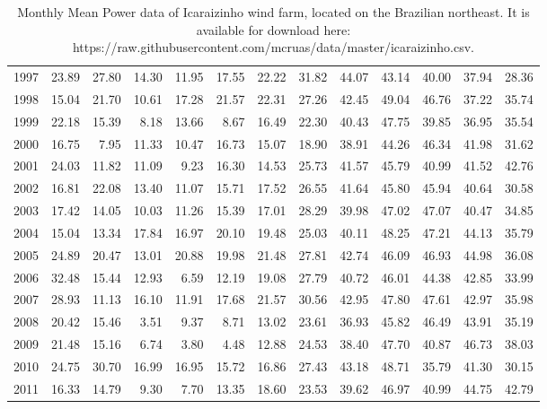 \begin{table}[ht]
\begin{tabular}{rrrrrrrrrrrrr}
  1997 & 23.89 & 27.80 & 14.30 & 11.95 & 17.55 & 22.22 & 31.82 & 44.07 & 43.14 & 40.00 & 37.94 & 28.36 \\ 
  1998 & 15.04 & 21.70 & 10.61 & 17.28 & 21.57 & 22.31 & 27.26 & 42.45 & 49.04 & 46.76 & 37.22 & 35.74 \\ 
  1999 & 22.18 & 15.39 & 8.18 & 13.66 & 8.67 & 16.49 & 22.30 & 40.43 & 47.75 & 39.85 & 36.95 & 35.54 \\ 
  2000 & 16.75 & 7.95 & 11.33 & 10.47 & 16.73 & 15.07 & 18.90 & 38.91 & 44.26 & 46.34 & 41.98 & 31.62 \\ 
  2001 & 24.03 & 11.82 & 11.09 & 9.23 & 16.30 & 14.53 & 25.73 & 41.57 & 45.79 & 40.99 & 41.52 & 42.76 \\ 
  2002 & 16.81 & 22.08 & 13.40 & 11.07 & 15.71 & 17.52 & 26.55 & 41.64 & 45.80 & 45.94 & 40.64 & 30.58 \\ 
  2003 & 17.42 & 14.05 & 10.03 & 11.26 & 15.39 & 17.01 & 28.29 & 39.98 & 47.02 & 47.07 & 40.47 & 34.85 \\ 
  2004 & 15.04 & 13.34 & 17.84 & 16.97 & 20.10 & 19.48 & 25.03 & 40.11 & 48.25 & 47.21 & 44.13 & 35.79 \\ 
  2005 & 24.89 & 20.47 & 13.01 & 20.88 & 19.98 & 21.48 & 27.81 & 42.74 & 46.09 & 46.93 & 44.98 & 36.08 \\ 
  2006 & 32.48 & 15.44 & 12.93 & 6.59 & 12.19 & 19.08 & 27.79 & 40.72 & 46.01 & 44.38 & 42.85 & 33.99 \\ 
  2007 & 28.93 & 11.13 & 16.10 & 11.91 & 17.68 & 21.57 & 30.56 & 42.95 & 47.80 & 47.61 & 42.97 & 35.98 \\ 
  2008 & 20.42 & 15.46 & 3.51 & 9.37 & 8.71 & 13.02 & 23.61 & 36.93 & 45.82 & 46.49 & 43.91 & 35.19 \\ 
  2009 & 21.48 & 15.16 & 6.74 & 3.80 & 4.48 & 12.88 & 24.53 & 38.40 & 47.70 & 40.87 & 46.73 & 38.03 \\ 
  2010 & 24.75 & 30.70 & 16.99 & 16.95 & 15.72 & 16.86 & 27.43 & 43.18 & 48.71 & 35.79 & 41.30 & 30.15 \\ 
  2011 & 16.33 & 14.79 & 9.30 & 7.70 & 13.35 & 18.60 & 23.53 & 39.62 & 46.97 & 40.99 & 44.75 & 42.79 \\ 
   \hline
\end{tabular}
\caption{Monthly Mean Power data of Icaraizinho wind farm, located on the Brazilian northeast. It is available for download here: https://raw.githubusercontent.com/mcruas/data/master/icaraizinho.csv.}
\label{tab:tabela-icaraizinho}
\end{table}
